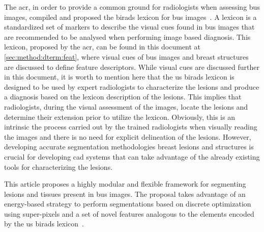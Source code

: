The \ac{acr}, in order to provide a common ground for radiologists when assessing \ac{bus} images, compiled and proposed the \ac{birads} lexicon for \ac{bus} images~\cite{biradsus}.
A lexicon is a standardized set of markers to describe the visual cues found in \ac{bus} images that are recommended to be analysed when performing image based diagnosis.
This lexicon, proposed by the \ac{acr}, can be found in this document at \cref{sec:method:dterm:feat}, where visual cues of \ac{bus} images and breast structures are discussed to define feature descriptors.
While visual cues are discussed further in this document, it is worth to mention here that the \ac{us} \ac{birads} lexicon is designed to be used by expert radiologists to characterize the lesions and produce a diagnosis based on the lexicon description of the lesions.
This implies that radiologists, during the visual assessment of the images,  locate the lesions and determine their extension prior to utilize the lexicon. Obviously, this is an intrinsic the process carried out by the trained radiologists when visually reading the images and there is no need for explicit delineation of the lesions.
However, developing accurate segmentation methodologies breast lesions and structures is crucial for developing \ac{cad} systems that can take advantage of the already existing tools for characterizing the lesions.

%

This article proposes a highly modular and flexible framework for segmenting lesions and tissues present in \ac{bus} images.
The proposal takes advantage of an energy-based strategy to perform segmentations based on discrete optimization using super-pixels and a set of novel features analogous to the elements encoded by the \ac{us} \ac{birads} lexicon~\cite{biradsus}.

